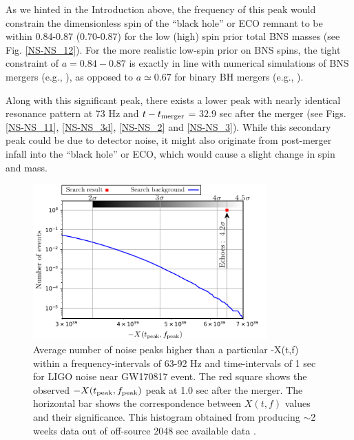 \documentclass[a4paper,11pt]{article}
\begin{document}
As we hinted in the Introduction above, the frequency of this peak would constrain the dimensionless spin of the ``black hole'' or ECO remnant to be within 0.84-0.87 (0.70-0.87) for the low (high) spin prior total BNS masses \cite{TheLIGOScientific:2017qsa} (see Fig. \ref{NS-NS_12}). For the more realistic low-spin prior on BNS spins, the tight constraint of $a=0.84-0.87$  is exactly in line with numerical simulations of BNS mergers (e.g., \cite{Kastaun:2013mv}), as opposed to $a\simeq 0.67$ for binary BH mergers (e.g., \cite{TheLIGOScientific:2016pea}). 

Along with this significant peak, there exists a lower peak with nearly identical resonance pattern at 73 Hz and $t-t_{\rm{merger}}$ = 32.9 sec after the merger (see Figs. \ref{NS-NS_11}, \ref{NS-NS_3d}, \ref{NS-NS_2} and \ref{NS-NS_3}). While this secondary peak could be due to detector noise, it might also originate from post-merger infall into the ``black hole'' or ECO, which would cause a slight change in spin and mass.

\begin{figure}[!tbp]
\centering
    \includegraphics[width=0.8\textwidth]{Histogram.pdf}
 \caption{Average number of noise peaks higher than a particular -X(t,f) within a frequency-intervals of 63-92 Hz and time-intervals of 1 sec for LIGO noise near GW170817 event. The red square shows the observed $-X(t_{\rm{peak}},f_{\rm{peak}})$ peak at 1.0 sec after the merger. The horizontal bar shows the correspondence between $X(t,f)$ values and their significance. This histogram obtained from producing $\sim$2 weeks data out of off-source 2048 sec available data \cite{GW170817}.}
 \label{NS-NS_10}
\end{figure}
\end{document}
